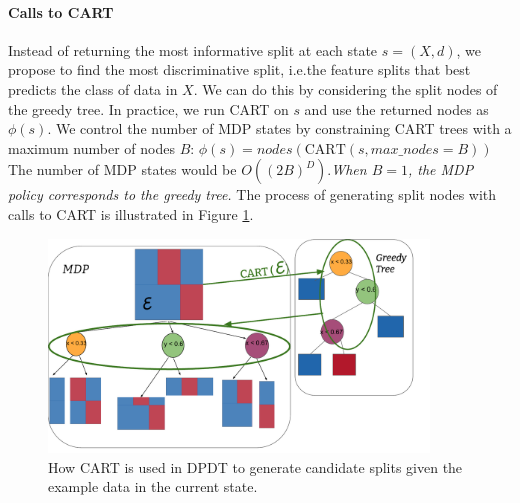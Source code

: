 \paragraph{Calls to CART}\label{cart-heuristic} Instead of returning the most informative split at each state $s=(X,d)$, we propose to find the most discriminative split, i.e.\@ the feature splits that best predicts the class of data in $X$.
We can do this by considering the split nodes of the greedy tree. In practice, we run CART on $s$ and use the returned nodes as $\phi(s)$. We control the number of MDP states by constraining CART trees with a maximum number of nodes $B$: $\phi(s) = nodes(\text{CART}(s, max\_nodes=B))$
The number of MDP states would be $O({(2B)}^D)$.\textit{When $B=1$, the MDP policy corresponds to the greedy tree.} The process of generating split nodes with calls to CART is illustrated in Figure \ref{fig:schema-dpdt}.

\begin{figure}
      \centering
      \includegraphics[trim={0 0cm 0 0},clip,width=0.9\textwidth]{images/figures/schematic_cart_node_select.pdf}
      \caption{How CART is used in DPDT to generate candidate splits given the example data in the current state.}\label{fig:schema-dpdt}
\end{figure}



